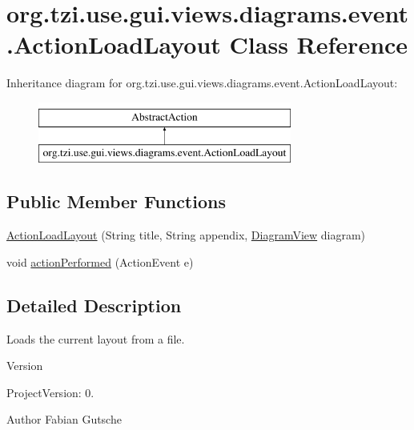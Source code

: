 \hypertarget{classorg_1_1tzi_1_1use_1_1gui_1_1views_1_1diagrams_1_1event_1_1_action_load_layout}{\section{org.\-tzi.\-use.\-gui.\-views.\-diagrams.\-event.\-Action\-Load\-Layout Class Reference}
\label{classorg_1_1tzi_1_1use_1_1gui_1_1views_1_1diagrams_1_1event_1_1_action_load_layout}
}
Inheritance diagram for org.\-tzi.\-use.\-gui.\-views.\-diagrams.\-event.\-Action\-Load\-Layout\-:\begin{figure}[H]
\begin{center}
\leavevmode
\includegraphics[height=2.000000cm]{classorg_1_1tzi_1_1use_1_1gui_1_1views_1_1diagrams_1_1event_1_1_action_load_layout}
\end{center}
\end{figure}
\subsection*{Public Member Functions}
\begin{DoxyCompactItemize}
\item 
\hyperlink{classorg_1_1tzi_1_1use_1_1gui_1_1views_1_1diagrams_1_1event_1_1_action_load_layout_ab6cfa846fa21a020301d1cc6abbdbd3c}{Action\-Load\-Layout} (String title, String appendix, \hyperlink{classorg_1_1tzi_1_1use_1_1gui_1_1views_1_1diagrams_1_1_diagram_view}{Diagram\-View} diagram)
\item 
void \hyperlink{classorg_1_1tzi_1_1use_1_1gui_1_1views_1_1diagrams_1_1event_1_1_action_load_layout_a24521adf31a38d652a89239b0379410a}{action\-Performed} (Action\-Event e)
\end{DoxyCompactItemize}


\subsection{Detailed Description}
Loads the current layout from a file.

\begin{DoxyVersion}{Version}

\end{DoxyVersion}
\begin{DoxyParagraph}{Project\-Version\-:}
0. 
\end{DoxyParagraph}
\begin{DoxyAuthor}{Author}
Fabian Gutsche 
\end{DoxyAuthor}


